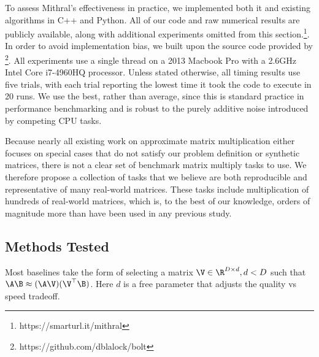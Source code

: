 
To assess Mithral's effectiveness in practice, we implemented both it and existing algorithms in C++ and Python. All of our code and raw numerical results are publicly available, along with additional experiments omitted from this section.\footnote{https://smarturl.it/mithral}. In order to avoid implementation bias, we built upon the source code provided by \citep{bolt}\footnote{https://github.com/dblalock/bolt}. All experiments use a single thread on a 2013 Macbook Pro with a 2.6GHz Intel Core i7-4960HQ processor. Unless stated otherwise, all timing results use five trials, with each trial reporting the lowest time it took the code to execute in 20 runs. We use the best, rather than average, since this is standard practice in performance benchmarking and is robust to the purely additive noise introduced by competing CPU tasks.

Because nearly all existing work on approximate matrix multiplication either focuses on special cases that do not satisfy our problem definition \cite{quicker-adc, pq, opq} or synthetic matrices, there is not a clear set of benchmark matrix multiply tasks to use. We therefore propose a collection of tasks that we believe are both reproducible and representative of many real-world matrices. These tasks include multiplication of hundreds of real-world matrices, which is, to the best of our knowledge, orders of magnitude more than have been used in any previous study.

\subsection{Methods Tested}
Most baselines take the form of selecting a matrix $\V \in \R^{D \times d}, d < D$ such that $\A \B \approx (\A \V) (\V^\top \B)$. Here $d$ is a free parameter that adjusts the quality vs speed tradeoff.


